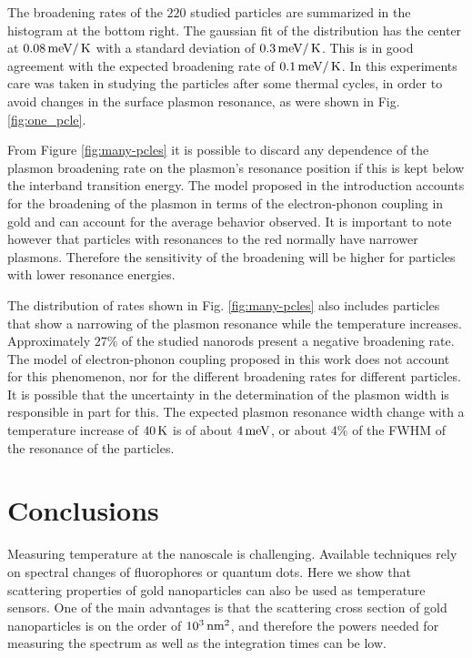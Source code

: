 The broadening rates of the $220$ studied particles are summarized in the
histogram at the bottom right. The gaussian fit of the distribution has the
center at $0.08 \,\textrm{meV}/\,\textrm{K}$ with a standard deviation of $0.3 \,\textrm{meV}/\,\textrm{K}$. This is in
good agreement with the expected broadening rate of $0.1\,\textrm{meV}/\,\textrm{K}$. In this
experiments care was taken in studying the particles after some thermal cycles,
in order to avoid changes in the surface plasmon resonance, as were shown in
Fig. \ref{fig:one_pcle}. 

From Figure \ref{fig:many-pcles} it is possible to discard any dependence of the
plasmon broadening rate on the plasmon's resonance position if this is kept
below the interband transition energy. The model proposed in the introduction
accounts for the broadening of the plasmon in terms of the electron-phonon
coupling in gold and can account for the average behavior observed. It is
important to note however that particles with resonances to the red normally
have narrower plasmons\cite{Sonnichsen2002}. Therefore the sensitivity of the
broadening will be higher for particles with lower resonance energies.

The distribution of rates shown in Fig. \ref{fig:many-pcles} also includes
particles that show a narrowing of the plasmon resonance while the temperature
increases. Approximately $27\%$ of the studied nanorods present a negative
broadening rate. The model of electron-phonon coupling proposed in this
work does not account for this phenomenon, nor for the different broadening
rates for different particles. It is possible that the uncertainty in the
determination of the plasmon width is responsible in part for this. The expected
plasmon resonance width change with a temperature increase of $40\,\textrm{K}$ is of about
$4\,\textrm{meV}$, or about $4\%$ of the FWHM of the resonance of the particles. 

\section{Conclusions}
Measuring temperature at the nanoscale is challenging. Available techniques rely
on spectral changes of fluorophores\cite{Chapman1995a} or quantum
dots\cite{Tanimoto2016,Yang2011a}. Here we show that scattering properties of
gold nanoparticles can also be used as temperature sensors. One of the main
advantages is that the scattering cross section of gold nanoparticles is on the
order of $10^3\,\textrm{nm}^2$, and therefore the powers needed for measuring the spectrum
as well as the integration times can be low.


